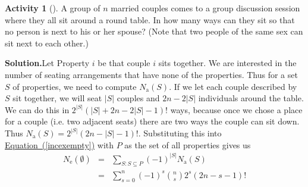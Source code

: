\documentclass[10pt,]{book}
\theoremstyle{plain}
\theoremstyle{definition}
\newtheorem{activity}[project]{Activity}
\numberwithin{equation}{chapter}
\newcommand{\amp}{&}
\begin{document}
\begin{activity}[]\label{relaxedmenage}
A group of \(n\) married couples comes to a group discussion session where they all sit around a round table. In how many ways can they sit so that no person is next to his or her spouse? (Note that two people of the same sex can sit next to each other.)%
\par\medskip\noindent%
\textbf{Solution.}\quad Let Property \(i\) be that couple \(i\) sits together. We are interested in the number of seating arrangements that have none of the properties. Thus for a set \(S\) of properties, we need to compute \(N_{\mbox{a} }(S)\). If we let each couple described by \(S\) sit together, we will seat \(|S|\) couples and \(2n-2|S|\) individuals around the table. We can do this in \(2^{|S|}(|S| + 2n-2 |S|-1)!\) ways, because once we chose a place for a couple (i.e. two adjacent seats) there are two ways the couple can sit down. Thus \(N_{\mbox{a} }(S) =2^{|S|}(2n-|S|-1)!\). Substituting this into \hyperref[incexempty]{Equation~(\ref{incexempty})} with \(P\) as the set of all properties gives us%
\begin{align*}
N_{\mbox{e} }(\emptyset) \amp =\amp  \sum_{S:S\subseteq P}
(-1)^{|S|} N_{\mbox{a} }(S)\\
\amp =\amp \sum_{s=0}^n(-1)^s{n\choose s}2^{s}(2n- s-1)!
\end{align*}
%
\end{activity}
\end{document}
